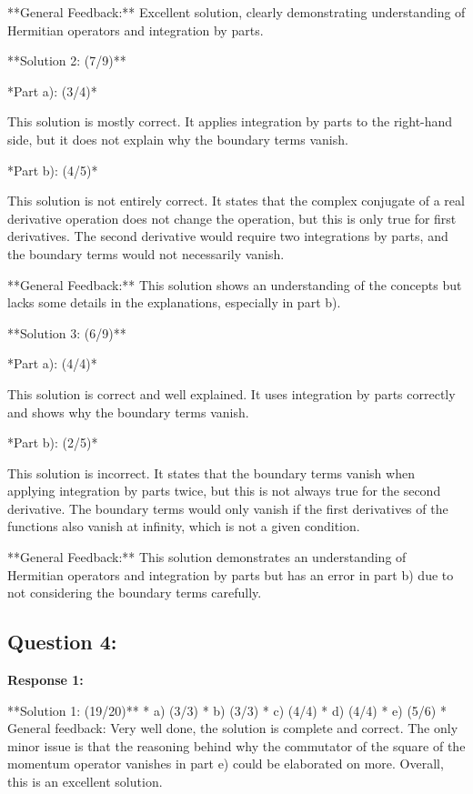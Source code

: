 \documentclass[a4paper,11pt]{article}
\begin{document}
**General Feedback:** Excellent solution, clearly demonstrating understanding of Hermitian operators and integration by parts.

**Solution 2: (7/9)**

*Part a): (3/4)*

This solution is mostly correct. It applies integration by parts to the right-hand side, but it does not explain why the boundary terms vanish.

*Part b): (4/5)*

This solution is not entirely correct. It states that the complex conjugate of a real derivative operation does not change the operation, but this is only true for first derivatives. The second derivative would require two integrations by parts, and the boundary terms would not necessarily vanish.

**General Feedback:** This solution shows an understanding of the concepts but lacks some details in the explanations, especially in part b).

**Solution 3: (6/9)**

*Part a): (4/4)*

This solution is correct and well explained. It uses integration by parts correctly and shows why the boundary terms vanish.

*Part b): (2/5)*

This solution is incorrect. It states that the boundary terms vanish when applying integration by parts twice, but this is not always true for the second derivative. The boundary terms would only vanish if the first derivatives of the functions also vanish at infinity, which is not a given condition.

**General Feedback:** This solution demonstrates an understanding of Hermitian operators and integration by parts but has an error in part b) due to not considering the boundary terms carefully.

\subsection*{Question 4:}

\textbf{Response 1:}

**Solution 1: (19/20)**
* a) (3/3)
* b) (3/3)
* c) (4/4)
* d) (4/4)
* e) (5/6)
* General feedback: Very well done, the solution is complete and correct. The only minor issue is that the reasoning behind why the commutator of the square of the momentum operator vanishes in part e) could be elaborated on more. Overall, this is an excellent solution.
\end{document}
